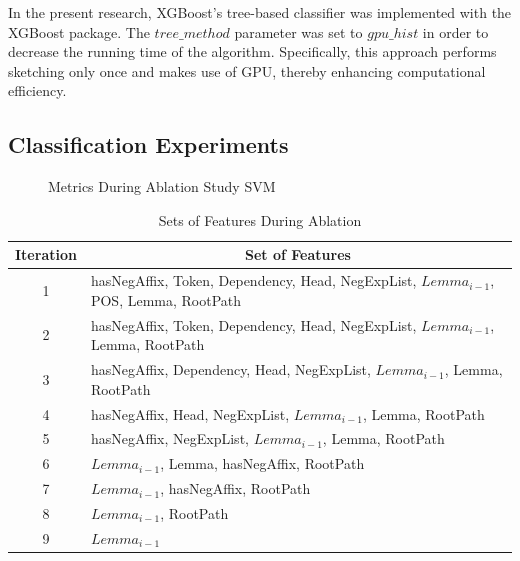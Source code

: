 In the present research, XGBoost's tree-based classifier was implemented with the XGBoost package. The $tree\_method$ parameter was set to $gpu\_hist$ in order to decrease the running time of the algorithm. Specifically, this approach performs sketching only once and makes use of GPU, thereby enhancing computational efficiency.

\FloatBarrier
\subsection{Classification Experiments}

\begin{figure}[!ht]
\centering
  \caption{Metrics During Ablation Study SVM}
  \label{fig:metrics_svm_training}
\end{figure}



\begin{table}[!ht]
\centering
\caption{Sets of Features During Ablation}
\begin{tabular}{cl}
\hline
\textbf{Iteration} & \multicolumn{1}{c}{\textbf{Set of Features}} \\
\hline
1 & hasNegAffix, Token, Dependency, Head, NegExpList, $Lemma_{i-1}$, POS, Lemma, RootPath \\
2 & hasNegAffix, Token, Dependency, Head, NegExpList, $Lemma_{i-1}$, Lemma, RootPath \\
3 & hasNegAffix, Dependency, Head, NegExpList, $Lemma_{i-1}$, Lemma, RootPath \\
4 & hasNegAffix, Head, NegExpList, $Lemma_{i-1}$, Lemma, RootPath \\
5 & hasNegAffix, NegExpList, $Lemma_{i-1}$, Lemma, RootPath \\
6 & $Lemma_{i-1}$, Lemma, hasNegAffix, RootPath \\
7 & $Lemma_{i-1}$, hasNegAffix, RootPath \\
8 & $Lemma_{i-1}$, RootPath \\
9 & $Lemma_{i-1}$ \\
\hline
\end{tabular}
\end{table}


